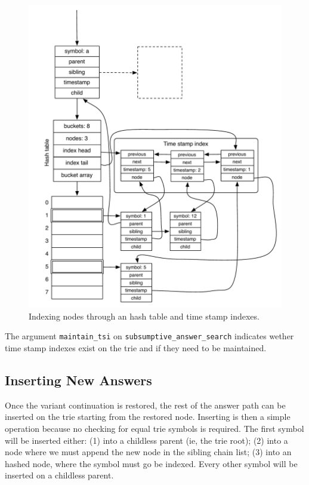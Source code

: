 \begin{figure}[ht]
  \centering
    \includegraphics[scale=0.6]{hash_table_tst.pdf}
  \caption{Indexing nodes through an hash table and time stamp indexes.}
  \label{fig:hash_table_tst}
\end{figure}

The argument \texttt{maintain\_tsi} on \texttt{subsumptive\_answer\_search} indicates wether
time stamp indexes exist on the trie and if they need to be maintained.

\subsection{Inserting New Answers}

Once the variant continuation is restored, the rest of the answer path can be inserted on the trie starting
from the restored node. Inserting is then a simple operation because no checking for equal trie symbols is required.
The first symbol will be inserted either: (1) into a childless parent (ie, the trie root); (2) into a node where
we must append the new node in the sibling chain list; (3) into an hashed node, where the symbol must go be indexed.
Every other symbol will be inserted on a childless parent.

